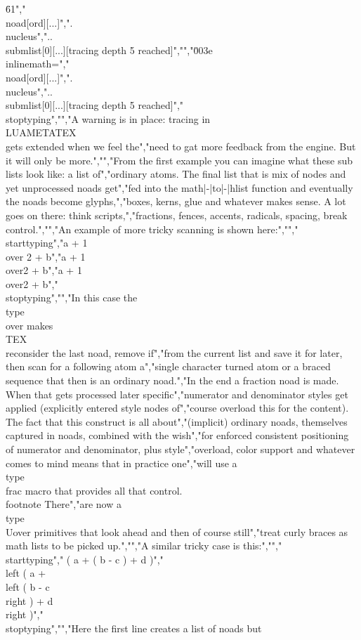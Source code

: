 \"61","\\noad[ord][...]",".\\nucleus","..\\submlist[0][...][tracing depth 5 reached]","","\u003e \\inlinemath=","\\noad[ord][...]",".\\nucleus","..\\submlist[0][...][tracing depth 5 reached]","\\stoptyping","","A warning is in place: tracing in \\LUAMETATEX\\ gets extended when we feel the","need to gat more feedback from the engine. But it will only be more.","","From the first example you can imagine what these sub lists look like: a list of","ordinary atoms. The final list that is mix of nodes and yet unprocessed noads get","fed into the math|-|to|-|hlist function and eventually the noads become glyphs,","boxes, kerns, glue and whatever makes sense. A lot goes on there: think scripts,","fractions, fences, accents, radicals, spacing, break control.","","An example of more tricky scanning is shown here:","","\\starttyping","a +   1 \\over 2   + b","a +  {1}\\over{2}  + b","a + {{1}\\over{2}} + b","\\stoptyping","","In this case the \\type {\\over} makes \\TEX\\ reconsider the last noad, remove if","from the current list and save it for later, then scan for a following atom a","single character turned atom or a braced sequence that then is an ordinary noad.","In the end a fraction noad is made. When that gets processed later specific","numerator and denominator styles get applied (explicitly entered style nodes of","course overload this for the content). The fact that this construct is all about","(implicit) ordinary noads, themselves captured in noads, combined with the wish","for enforced consistent positioning of numerator and denominator, plus style","overload, color support and whatever comes to mind means that in practice one","will use a \\type {\\frac} macro that provides all that control. \\footnote {There","are now a \\type {\\Uover} primitives that look ahead and then of course still","treat curly braces as math lists to be picked up.}","","A similar tricky case is this:","","\\starttyping","      ( a +       ( b - c        ) + d        )","\\left ( a + \\left ( b - c \\right ) + d \\right )","\\stoptyping","","Here the first line creates a list of noads but 